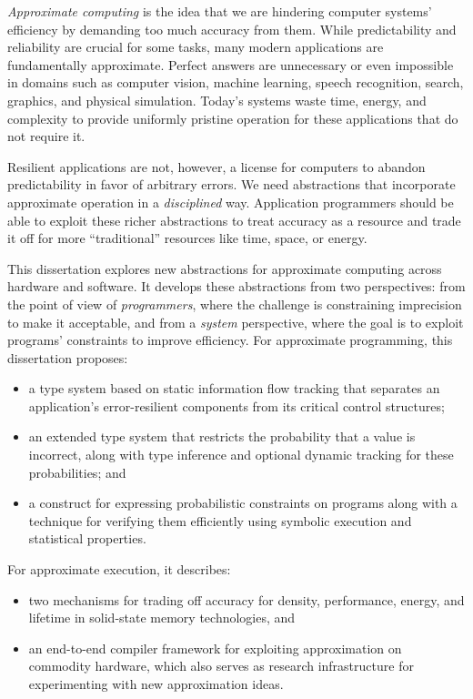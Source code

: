 \emph{Approximate computing} is the idea that we are hindering computer
systems' efficiency by demanding too much accuracy from them.
While predictability and reliability are crucial for some tasks, many
modern applications are fundamentally approximate.
Perfect answers are unnecessary or even impossible in domains such as
computer vision, machine learning,
speech recognition, search, graphics, and physical simulation.
Today's systems waste time, energy, and complexity to provide uniformly
pristine operation for these applications that do not require it.

Resilient applications are not, however, a license for computers to abandon
predictability in favor of arbitrary errors.
We need abstractions that incorporate approximate operation in a
\emph{disciplined} way.
Application programmers should be able to exploit these richer abstractions to
treat accuracy as a resource and trade it off for more ``traditional''
resources like time, space, or energy.

This dissertation explores new abstractions for approximate computing across
hardware and software.
It develops these abstractions from two perspectives:
from the point of view of \emph{programmers}, where the challenge is
constraining imprecision to make it acceptable,
and from a \emph{system} perspective, where the goal is to exploit programs'
constraints to improve efficiency.
For approximate programming, this dissertation proposes:
%
\begin{itemize}
\item
a type system based on static information flow tracking that separates an
application's error-resilient components from its critical control structures;
\item
an extended type system that restricts the probability that a value
is incorrect, along with type inference and optional dynamic tracking for
these probabilities; and
\item
a construct for expressing probabilistic constraints on programs along with a
technique for verifying them efficiently using symbolic execution and
statistical properties.
\end{itemize}
%
For approximate execution, it describes:
%
\begin{itemize}
\item
two mechanisms for trading off accuracy for density, performance, energy, and
lifetime in solid-state memory technologies, and
\item
an end-to-end compiler framework for exploiting approximation on
commodity hardware, which also serves as research infrastructure for
experimenting with new approximation ideas.
\end{itemize}
